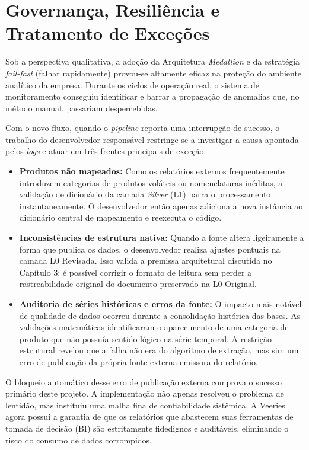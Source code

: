 \section{Governança, Resiliência e Tratamento de Exceções}

Sob a perspectiva qualitativa, a adoção da Arquitetura \textit{Medallion} e da estratégia \textit{fail-fast} (falhar rapidamente) provou-se altamente eficaz na proteção do ambiente analítico da empresa. Durante os ciclos de operação real, o sistema de monitoramento conseguiu identificar e barrar a propagação de anomalias que, no método manual, passariam despercebidas.

Com o novo fluxo, quando o \textit{pipeline} reporta uma interrupção de sucesso, o trabalho do desenvolvedor responsável restringe-se a investigar a causa apontada pelos \textit{logs} e atuar em três frentes principais de exceção:

\begin{itemize}
    \item \textbf{Produtos não mapeados:} Como os relatórios externos frequentemente introduzem categorias de produtos voláteis ou nomenclaturas inéditas, a validação de dicionário da camada \textit{Silver} (L1) barra o processamento instantaneamente. O desenvolvedor então apenas adiciona a nova instância ao dicionário central de mapeamento e reexecuta o código.
    \item \textbf{Inconsistências de estrutura nativa:} Quando a fonte altera ligeiramente a forma que publica os dados, o desenvolvedor realiza ajustes pontuais na camada L0 Revisada. Isso valida a premissa arquitetural discutida no Capítulo 3: é possível corrigir o formato de leitura sem perder a rastreabilidade original do documento preservado na L0 Original.
    \item \textbf{Auditoria de séries históricas e erros da fonte:} O impacto mais notável de qualidade de dados ocorreu durante a consolidação histórica das bases. As validações matemáticas identificaram o aparecimento de uma categoria de produto que não possuía sentido lógico na série temporal. A restrição estrutural revelou que a falha não era do algoritmo de extração, mas sim um erro de publicação da própria fonte externa emissora do relatório. 
\end{itemize}

O bloqueio automático desse erro de publicação externa comprova o sucesso primário deste projeto. A implementação não apenas resolveu o problema de lentidão, mas instituiu uma malha fina de confiabilidade sistêmica. A Veeries agora possui a garantia de que os relatórios que abastecem suas ferramentas de tomada de decisão (BI) são estritamente fidedignos e auditáveis, eliminando o risco do consumo de dados corrompidos.